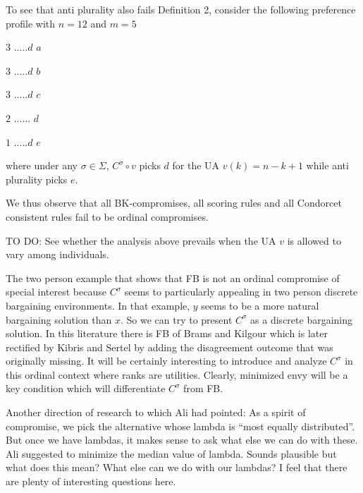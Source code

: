 \documentclass[version=3.21, pagesize, notitlepage, twoside=off, bibliography=totoc, DIV=calc, fontsize=12pt, a4paper]{scrartcl}
\begin{document}
To see that anti plurality also fails Definition 2, consider the following preference profile with $n=12$ and $m=5$

$3$ $.....d$ $a$

$3$ $.....d$ $b$

$3$ $.....d$ $c$

$2$ $......$ $d$

$1$ $.....d$ $e$

\bigskip

where under any $\sigma \in \Sigma $, $C^{\sigma }\circ v$ picks $d$ for the UA $v(k)=n-k+1$ while anti plurality picks $e$.

We thus observe that all BK-compromises, all scoring rules and all Condorcet consistent rules fail to be ordinal compromises.

TO DO: See whether the analysis above prevails when the UA $v$ is allowed to vary among individuals.

The two person example that shows that FB is not an ordinal compromise of special interest because $C^{\sigma }$ seems to particularly appealing in two person discrete bargaining environments. In that example, $y$ seems to be a more natural bargaining solution than $x$. So we can try to present $C^{\sigma }$ as a discrete bargaining solution. In this literature there is FB of Brams and Kilgour which is later rectified by Kibris and Sertel by adding the disagreement outcome that was originally missing. It will be certainly interesting to introduce and analyze $C^{\sigma }$ in this ordinal context where ranks are utilities. Clearly, minimized envy will be a key condition which will differentiate $C^{\sigma }$ from FB.

Another direction of research to which Ali had pointed: As a spirit of compromise, we pick the alternative whose lambda is “most equally distributed”. But once we have lambdas, it makes sense to ask what else we can do with these. Ali suggested to minimize the median value of lambda. Sounds plausible but what does this mean? What else can we do with our lambdas? I feel that there are plenty of interesting questions here.
\end{document}
